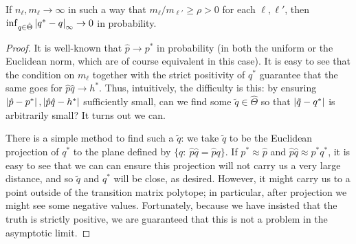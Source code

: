 \begin{thm}\label{thm:mainthm}
If $n_\ell, m_\ell\rightarrow \infty$ in such a way that $m_\ell/m_{\ell'} \geq \rho>0$ for each $\ell,\ell'$, then $\inf_{q\in \hat\Theta} \left|q^*-q\right|_\infty\rightarrow 0$ in probability.
\end{thm}

\begin{proof}
It is well-known that $\hat p\rightarrow p^*$ in probability (in both the uniform or the Euclidean norm, which are of course equivalent in this case).  It is easy to see that the condition on $m_\ell$ together with the strict positivity of $q^*$ guarantee that the same goes for $\hat p\hat q\rightarrow h^*$.  Thus, intuitively, the difficulty is this: by ensuring $\left|\hat p - p^*\right|,\left|\hat p\hat q - h^*\right|$ sufficiently small, can we find some $\tilde q\in \hat \Theta$ so that $\left|\tilde q - q^*\right|$ is arbitrarily small?  It turns out we can.

There is a simple method to find such a $\tilde q$: we take $\tilde q$ to be the Euclidean projection of $q^*$ to the plane defined by $\{q:\ \hat p\hat q=\hat pq\}$.  If $p^* \approx \hat p$ and $\hat p \hat q \approx p^* q^*$, it is easy to see that we can can ensure this projection will not carry us a very large distance, and so $\tilde q$ and $q^*$ will be close, as desired.  However, it might carry us to a point outside of the transition matrix polytope; in particular, after projection we might see some negative values.  Fortunately, because we have insisted that the truth is strictly positive, we are guaranteed that this is not a problem in the asymptotic limit.


\end{proof}
